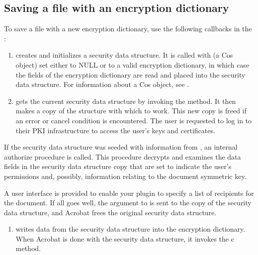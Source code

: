 \documentclass[letterpaper,12pt,english,openany,oneside]{sphinxmanual}
\begin{document}
\subsection{Saving a file with an encryption dictionary}
\label{\detokenize{Plugins_Security:saving-a-file-with-an-encryption-dictionary}}
To save a file with a new encryption dictionary, use the following callbacks in the  :
\begin{enumerate}
%
\item {} 
 creates and initializes a security data structure. It is called with  (a Cos object) set either to NULL or to a valid encryption dictionary, in which case the fields of the encryption dictionary are read and placed into the security data structure. For information about a Cos object, see .

\item {} 
 gets the current security data structure by invoking the  method. It then makes a copy of the structure with which to work. This new copy is freed if an error or cancel condition is encountered. The user is requested to log in to their PKI infrastructure to access the user’s keys and certificates.

\end{enumerate}

If the security data structure was seeded with information from , an internal authorize procedure is called. This procedure decrypts and examines the data fields in the security data structure copy that are set to indicate the user’s permissions and, possibly, information relating to the document symmetric key.

A user interface is provided to enable your plugin to specify a list of recipients for the document. If all goes well, the  argument to  is sent to the copy of the security data structure, and Acrobat frees the original security data structure.
\begin{enumerate}
%
\item {} 
 writes data from the security data structure into the encryption dictionary. When Acrobat is done with the security data structure, it invokes the  c method.

\end{enumerate}
\end{document}
